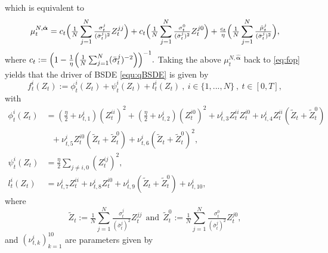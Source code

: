 \documentclass[10pt,a4paper]{article}
\newcommand{\Balpha}{\boldsymbol{\alpha}}
\theoremstyle{plain}
\theoremstyle{definition}
\numberwithin{equation}{section}
\begin{document}
which is equivalent to
\begin{equation}
\label{equ:RepmuN}
\mu_{t}^{N,\hat{\Balpha}} = c_{t}\Bigl(\tfrac{1}{N}\sum_{j=1}^{N}\tfrac{\sigma_{t}^{j}}{(\bar{\sigma}_{t}^{j})^{2}}Z_{t}^{jj}\Bigr) + c_{t}\Bigl(\tfrac{1}{N}\sum_{j=1}^{N}\tfrac{\sigma_{t}^{0}}{(\bar{\sigma}_{t}^{j})^{2}}Z_{t}^{j0}\Bigr) + \tfrac{c_{t}}{\eta}\Bigl(\tfrac{1}{N}\sum_{j=1}^{N}\tfrac{\tilde{\mu}_{t}^{j}}{(\bar{\sigma}_{t}^{j})^{2}}\Bigr),
\end{equation}
where  
$
c_{t}:=\Bigl(1-\tfrac{1}{\eta}\Bigl(\tfrac{1}{N}\sum_{j=1}^{N}(\bar{\sigma}_{t}^{j})^{-2}\Bigr)\Bigr)^{-1}.
$
Taking the above $\mu_{t}^{N,\hat{\Balpha}}$ back to \eqref{eq:fop} yields that the driver of BSDE \eqref{equ:qBSDE} is given by
\begin{equation}
\label{equ:Def_f}
f_{t}^{i}(Z_{t}) := \phi_{t}^{i}(Z_{t}) + \psi_{t}^{i}(Z_{t}) + l_{t}^{i}(Z_{t}) \ , \ i \in \{1,...,N\} \ , \ t \in [0,T],
\end{equation}
with
\begin{align}
\phi_{t}^{i}(Z_{t}) &= (\tfrac{\eta}{2}+\nu_{t,1}^{i})(Z_{t}^{ii})^{2} + (\tfrac{\eta}{2}+\nu_{t,2}^{i})(Z_{t}^{i0})^{2} + \nu_{t,3}^{i}Z_{t}^{ii}Z_{t}^{i0} + \nu_{t,4}^{i}Z_{t}^{ii}(\tilde{Z}_{t} + \tilde{Z}_{t}^{0}) \nonumber \\
&\ \ \ + \nu_{t,5}^{i}Z_{t}^{i0}(\tilde{Z}_{t} + \tilde{Z}_{t}^{0}) + \nu_{t,6}^{i}(\tilde{Z}_{t} + \tilde{Z}_{t}^{0})^{2}, \label{equ:Def_g} \\
\psi_{t}^{i}(Z_{t}) &= \tfrac{\eta}{2}\sum_{j \neq i,0}(Z_{t}^{ij})^{2}, \label{equ:Def_h} \\
l_{t}^{i}(Z_{t}) &= \nu_{t,7}^{i}Z_{t}^{ii} + \nu_{t,8}^{i}Z_{t}^{i0} + \nu_{t,9}^{i}(\tilde{Z}_{t} + \tilde{Z}_{t}^{0}) + \nu_{t,10}^{i}, \label{equ:Def_l}
\end{align}
where 
\begin{equation}
\label{equ:DefZtilde}
\tilde{Z}_{t} := \tfrac{1}{N}\sum_{j=1}^{N}\tfrac{\sigma_{t}^{j}}{(\bar{\sigma}_{t}^{j})^{2}}Z_{t}^{jj} \ \ \text{and} \ \ \tilde{Z}_{t}^{0} := \tfrac{1}{N}\sum_{j=1}^{N}\tfrac{\sigma_{t}^{0}}{(\bar{\sigma}_{t}^{j})^{2}}Z_{t}^{j0},
\end{equation}
and $(\nu^i_{t,k})_{k=1}^{10}$ are parameters given by
\end{document}
